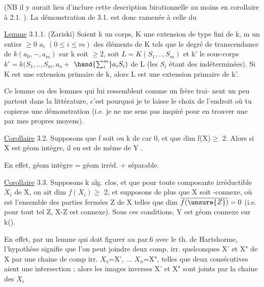 
(NB il y aurait lieu d'inclure cette description birationnelle au moins
en corollaire à 2.1. ). La démonstration de 3.1. est donc ramenée à
celle du

\uline{Lemme} 3.1.1. (Zariski) Soient k un corps, K une extension de type fini de k, m un entier $\geqslant 0$
$a_i$ $(0\leqslant i\leqslant m)$ des éléments de K  tels que le degré de transcendance de $k(a_0,-,a_m)$ sur k soit $\geqslant 2$,
 soit $L = K(S_1,..,S_m)$ et k' le sous-corps $k'= k(S_1,..,S_m,a_o +$
$\hand{\sum_{i}^{m}}a_iS_i)$ de L (les $S_i$ étant des indéterminées). \hand{,} Si K est une
extension primaire de k, alors L est une extension primaire de k'.

\placedmargin{$|$} Ce lemme\hand{,} ou des lemmes qui lui ressemblent comme un frère\hand{,} trai-%
nent un peu partout dans la littérature, c'est pourquoi je te laisse le
choix de l'endroit où tu copieras une démonstration (i.e. je ne me sens
pas inspiré pour en trouver une par mes propres moyens).

\uline{Corollaire} 3.2. Supposons que f soit   ou k de car 0,
et que dim f(X)$\geqslant$ 2. Alors si X est géom intègre, il en est de même de
Y .

En effet, géom intègre = géom irréd. + séparable.

\uline{Corollaire} 3.3. Supposons k alg. clos, et que pour toute composante irréductible $X_i$
de X, on ait dim $f(X_i)$$\geqslant$ 2, et supposons de plus que X soit -connexe,
où  est l'ensemble des parties fermées Z de X telles que dim $\overline{f(\unsure{Z})}=0$
(i.e. pour tout tel Z, X-Z est connexe). Sous ces conditions, Y est
géom connexe sur k().

En effet, par un lemme qui doit figurer au par.6 avec le th. de
Hartshorme, l'hypothèse signifie que l'on peut joindre deux comp. irr.
quelconques X' et X" de X par une chaine de comp irr. $X_o$=X', ...
$X_n$=X", telles que deux consécutives aient une intersection ; alors
les images inverses X' et X" sont joints par la chaine des $X_{i}$ 

